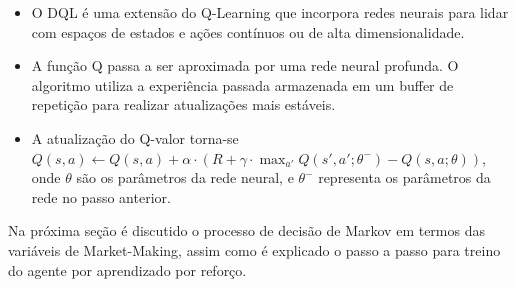 \begin{itemize}
	\begin{itemize}
		\item O DQL é uma extensão do Q-Learning que incorpora redes neurais para lidar com espaços de estados e ações contínuos ou de alta dimensionalidade.
		\item A função Q passa a ser aproximada por uma rede neural profunda. O algoritmo utiliza a experiência passada armazenada em um buffer de repetição para realizar atualizações mais estáveis.
		\item A atualização do Q-valor torna-se \(Q(s, a) \leftarrow Q(s, a) + \alpha \cdot (R + \gamma \cdot \max_{a'} Q(s', a'; \theta^-) - Q(s, a; \theta))\), onde \(\theta\) são os parâmetros da rede neural, e \(\theta^-\) representa os parâmetros da rede no passo anterior.
	\end{itemize}
\end{itemize}

Na próxima seção é discutido o processo de decisão de Markov em termos das variáveis de Market-Making, assim como é explicado o passo a passo para treino do agente por aprendizado por reforço.